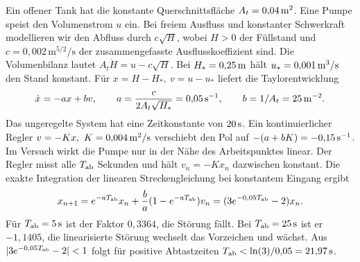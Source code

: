 Ein offener Tank hat die konstante Querschnittsfläche \(A_t=0{,}04\,\mathrm{m^2}\). Eine Pumpe speist den Volumenstrom \(u\) ein. Bei freiem Ausfluss und konstanter Schwerkraft modellieren wir den Abfluss durch \(c\sqrt H\), wobei \(H>0\) der Füllstand und \(c=0{,}002\,\mathrm{m}^{5/2}/\mathrm s\) der zusammengefasste Ausflusskoeffizient sind. Die Volumenbilanz lautet \(A_t\dot H=u-c\sqrt H\). Bei \(H_*=0{,}25\,\mathrm{m}\) hält \(u_*=0{,}001\,\mathrm{m^3/s}\) den Stand konstant.
Für \(x=H-H_*,\ v=u-u_*\) liefert die Taylorentwicklung
\[
 \dot x=-a x+bv,\qquad a=\frac{c}{2A_t\sqrt{H_*}}=0{,}05\,\mathrm{s^{-1}},
 \qquad b=1/A_t=25\,\mathrm{m^{-2}} .
\]
Das ungeregelte System hat eine Zeitkonstante von \(20\,\mathrm{s}\). Ein kontinuierlicher Regler \(v=-Kx,\ K=0{,}004\unitm{m^2/s}\) verschiebt den Pol auf \(-(a+bK)=-0{,}15\,\mathrm{s^{-1}}\). Im Versuch wirkt die Pumpe nur in der Nähe des Arbeitspunktes linear.
Der Regler misst alle \(T_{\rm ab}\) Sekunden und hält \(v_n=-Kx_n\) dazwischen konstant. Die exakte Integration der linearen Streckengleichung bei konstantem Eingang ergibt
\[
 x_{n+1}=e^{-aT_{\rm ab}}x_n+\frac{b}{a}(1-e^{-aT_{\rm ab}})v_n
       =(3e^{-0{,}05T_{\rm ab}}-2)x_n .
\]
Für \(T_{\rm ab}=5\,\mathrm{s}\) ist der Faktor \(0{,}3364\), die Störung fällt. Bei \(T_{\rm ab}=25\,\mathrm{s}\) ist er \(-1{,}1405\), die linearisierte Störung wechselt das Vorzeichen und wächst. Aus \(|3e^{-0{,}05T_{\rm ab}}-2|<1\) folgt für positive Abtastzeiten \(T_{\rm ab}<\ln(3)/0{,}05=21{,}97\,\mathrm{s}\).

